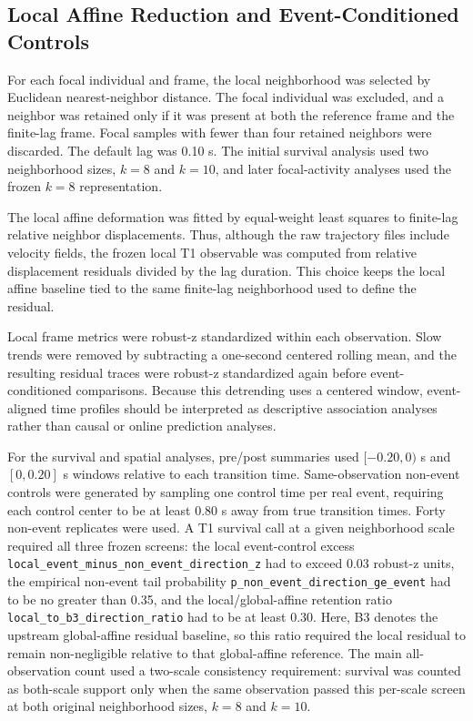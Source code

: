 \subsection{Local Affine Reduction and Event-Conditioned Controls}

For each focal individual and frame, the local neighborhood was selected by
Euclidean nearest-neighbor distance. The focal individual was excluded, and a
neighbor was retained only if it was present at both the reference frame and
the finite-lag frame. Focal samples with fewer than four retained neighbors
were discarded. The default lag was 0.10 s. The initial survival analysis used
two neighborhood sizes, $k=8$ and $k=10$, and later focal-activity analyses
used the frozen $k=8$ representation.

The local affine deformation was fitted by equal-weight least squares to
finite-lag relative neighbor displacements. Thus, although the raw trajectory
files include velocity fields, the frozen local T1 observable was computed
from relative displacement residuals divided by the lag duration. This choice
keeps the local affine baseline tied to the same finite-lag neighborhood used
to define the residual.

Local frame metrics were robust-z standardized within each observation. Slow
trends were removed by subtracting a one-second centered rolling mean, and the
resulting residual traces were robust-z standardized again before
event-conditioned comparisons. Because this detrending uses a centered window,
event-aligned time profiles should be interpreted as descriptive association
analyses rather than causal or online prediction analyses.

For the survival and spatial analyses, pre/post summaries used
$[-0.20,0)$ s and $[0,0.20]$ s windows relative to each transition time.
Same-observation non-event controls were generated by sampling one control
time per real event, requiring each control center to be at least 0.80 s away
from true transition times. Forty non-event replicates were used. A T1
survival call at a given neighborhood scale required all three frozen screens:
the local event-control excess
\texttt{local\_event\_minus\_non\_event\_direction\_z} had to exceed 0.03
robust-z units, the empirical non-event tail probability
\texttt{p\_non\_event\_direction\_ge\_event} had to be no greater than 0.35,
and the local/global-affine retention ratio
\texttt{local\_to\_b3\_direction\_ratio} had to be at least 0.30.
Here, B3 denotes the upstream global-affine residual baseline, so this ratio
required the local residual to remain non-negligible relative to that
global-affine reference.
The main all-observation count used a two-scale consistency requirement:
survival was counted as both-scale support only when the same observation
passed this per-scale screen at both original neighborhood sizes, $k=8$ and
$k=10$.

